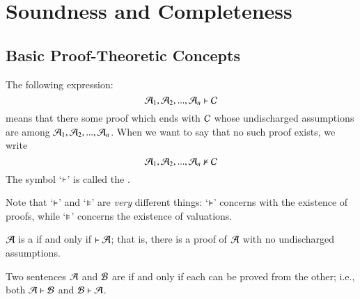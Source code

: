 %
%
%
\chapter{Soundness and Completeness}
\label{SoundComp} %

\section{ Basic Proof-Theoretic Concepts}

\begin{definition}
    The following expression: \begin{equation*}
        \mathcal{A}_1,\mathcal{A}_2,...,\mathcal{A}_n\vdash\mathcal{C}
    \end{equation*}
    means that there  some proof which ends with $\mathcal{C}$ whose undischarged assumptions are among $\mathcal{A}_1,\mathcal{A}_2,...,\mathcal{A}_n$. When we want to say that no such proof exists, we write \begin{equation*}
        \mathcal{A}_1,\mathcal{A}_2,...,\mathcal{A}_n\nvdash\mathcal{C}
    \end{equation*}
    The symbol `$\vdash$' is called the .
\end{definition}

\begin{remark}
    Note that `$\vdash$' and `$\vDash$' are \emph{very} different things: `$\vdash$' concerns with the existence of proofs, while `$\vDash$' concerns the existence of valuations.
\end{remark}

\begin{definition}
    $\mathcal{A}$ is a  if and only if $\vdash \mathcal{A}$; that is, there is a proof of $\mathcal{A}$ with no undischarged assumptions.
\end{definition}


\begin{definition}
    Two sentences $\mathcal{A}$ and $\mathcal{B}$ are  if and only if each can be proved from the other; i.e., both $\mathcal{A} \vdash \mathcal{B}$ and $\mathcal{B}\vdash\mathcal{A}$.
\end{definition}

